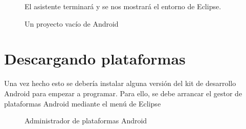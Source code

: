 \documentclass[a4paper,12pt,spanish]{sphinxmanual}
\begin{document}
\begin{figure}[htbp]
\centering
\capstart

\caption{Un proyecto vacío de Android}{\small 
El asistente terminará y se nos mostrará el entorno de Eclipse.
}\end{figure}


\section{Descargando plataformas}
\label{tema1:descargando-plataformas}
Una vez hecho esto se debería instalar alguna versión del kit de desarrollo Android para empezar a programar. Para ello, se debe arrancar el gestor de plataformas Android mediante el menú de Eclipse 
\begin{figure}[htbp]
\centering
\capstart

\caption{Administrador de plataformas Android}\end{figure}
\end{document}
